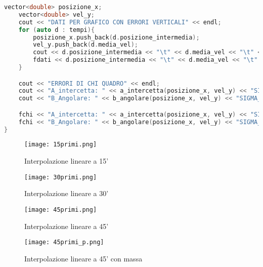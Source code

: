 \documentclass[a4paper,11pt,oneside]{article}
\begin{document}
\begin{lstlisting}[language=C++, label=lst:seconda_analisi.cxx, caption=seconda\_analisi.cxx]
    vector<double> posizione_x;
    vector<double> vel_y;
    cout << "DATI PER GRAFICO CON ERRORI VERTICALI" << endl;
    for (auto d : tempi){
        posizione_x.push_back(d.posizione_intermedia);
        vel_y.push_back(d.media_vel);
        cout << d.posizione_intermedia << "\t" << d.media_vel << "\t" << d.dstd_vel << endl;
        fdati << d.posizione_intermedia << "\t" << d.media_vel << "\t" << d.dstd_vel << endl;
    }

    cout << "ERRORI DI CHI QUADRO" << endl;
    cout << "A_intercetta: " << a_intercetta(posizione_x, vel_y) << "SIGMA_A: " << sigma_a(posizione_x, vel_y) << endl;
    cout << "B_Angolare: " << b_angolare(posizione_x, vel_y) << "SIGMA_B: " << sigma_b(posizione_x, vel_y) << endl;

    fchi << "A_intercetta: " << a_intercetta(posizione_x, vel_y) << "SIGMA_A: " << sigma_a(posizione_x, vel_y) << endl;
    fchi << "B_Angolare: " << b_angolare(posizione_x, vel_y) << "SIGMA_B: " << sigma_b(posizione_x, vel_y) << endl;
}
\end{lstlisting}


\begin{figure}[h]
    \caption{Interpolazione lineare a 15'}
    \label{fig:g_0_15}
    \centering
           \texttt{[image: 15primi.png]}
\end{figure}

\begin{figure}[h]
    \caption{Interpolazione lineare a 30'}
    \label{fig:g_0_30}
    \centering
           \texttt{[image: 30primi.png]}
\end{figure}

\begin{figure}[h]
    \caption{Interpolazione lineare a 45'}
    \label{fig:g_0_45}
    \centering
           \texttt{[image: 45primi.png]}
\end{figure}

\begin{figure}[h]
    \caption{Interpolazione lineare a 45' con massa}
    \label{fig:g_0_p45}
    \centering
           \texttt{[image: 45primi\_p.png]}
\end{figure}
\end{document}
